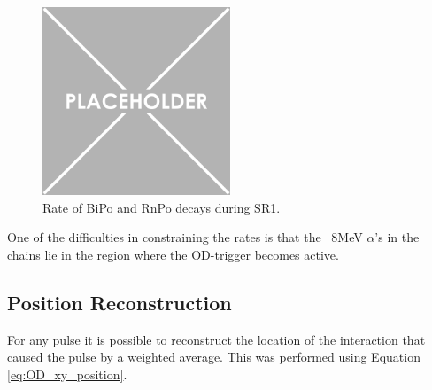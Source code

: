 \begin{figure}
    \centering
    \includegraphics[width=0.5\textwidth]{Figures/Placeholder.png}
    \caption{Rate of BiPo and RnPo decays during SR1.}
    \label{fig:OD_BiPo_Rate}
\end{figure}

\par
One of the difficulties in constraining the rates is that the ~8MeV $\alpha$'s in the chains lie in the region where the OD-trigger becomes active.


\subsection{Position Reconstruction}
\par
For any pulse it is possible to reconstruct the location of the interaction that caused the pulse by a weighted average.
This was performed using Equation \ref{eq:OD_xy_position}.

